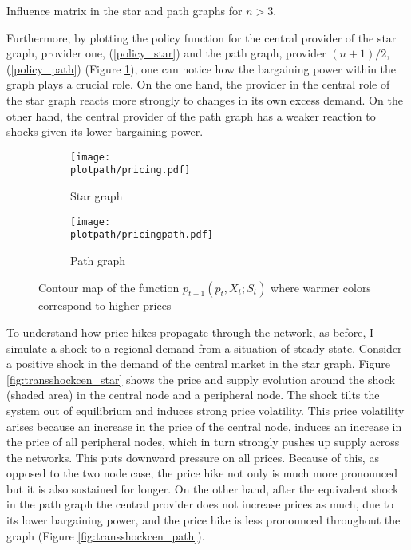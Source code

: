 \begin{center}
  \begin{table}[H]
    \centering
    
    \caption{Influence matrix in the star and path graphs for $n > 3$.}
    \label{table:influence}
  \end{table}
\end{center}


Furthermore, by plotting the policy function for the central provider of the star graph, provider one, (\ref{policy_star}) and the path graph, provider $(n+1) / 2$, (\ref{policy_path}) (Figure \ref{fig:p}), one can notice how the bargaining power within the graph plays a crucial role. On the one hand, the provider in the central role of the star graph reacts more strongly to changes in its own excess demand. On the other hand, the central provider of the path graph has a weaker reaction to shocks given its lower bargaining power.

\begin{center}
  \begin{figure}[H]
    \begin{subfigure}{0.475\textwidth}
      \centering
      \texttt{[image: \\plotpath/pricing.pdf]}
      \caption{Star graph}
    \end{subfigure}
    \hfill
    \begin{subfigure}{0.475\textwidth}
      \centering
      \texttt{[image: \\plotpath/pricingpath.pdf]}
      \caption{Path graph}
    \end{subfigure}
    \caption{Contour map of the function $p_{t+1}(p_t, X_t; S_t)$ where warmer colors correspond to higher prices}
    \label{fig:p}
  \end{figure}
\end{center}

To understand how price hikes propagate through the network, as before, I simulate a shock to a regional demand from a situation of steady state. Consider a positive shock in the demand of the central market in the star graph. Figure \ref{fig:transshockcen_star} shows the price and supply evolution around the shock (shaded area) in the central node and a peripheral node. The shock tilts the system out of equilibrium and induces strong price volatility. This price volatility arises because an increase in the price of the central node, induces an increase in the price of all peripheral nodes, which in turn strongly pushes up supply across the networks. This puts downward pressure on all prices. Because of this, as opposed to the two node case, the price hike not only is much more pronounced but it is also sustained for longer. On the other hand, after the equivalent shock in the path graph the central provider does not increase prices as much, due to its lower bargaining power, and the price hike is less pronounced throughout the graph (Figure \ref{fig:transshockcen_path}).

